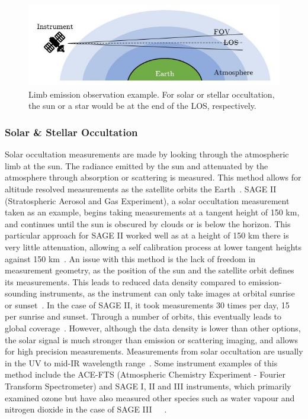  \begin{figure}
\centering
  \includegraphics{chap2_images/Limb_emission_geometry_example.JPG}
  \caption{Limb emission observation example. For solar or stellar occultation, the sun or a star would be at the end of the LOS, respectively.}
  \label{fig:limb_emission_geometry}
\end{figure}

\subsubsection{Solar \& Stellar Occultation}
Solar occultation measurements are made by looking through the atmospheric limb at the sun. The radiance emitted by the sun and attenuated by the atmosphere through absorption or scattering is measured. This method allows for altitude resolved measurements as the satellite orbits the Earth~\citep{SPARC}. SAGE II (Stratospheric Aerosol and Gas Experiment), a solar occultation measurement taken as an example, begins taking measurements at a tangent height of 150 km, and continues until the sun is obscured by clouds or is below the horizon. This particular approach for SAGE II worked well as at a height of 150 km there is very little attenuation, allowing a self calibration process at lower tangent heights against 150 km~\citep{SAGEII_solar_occultation}. An issue with this method is the lack of freedom in measurement geometry, as the position of the sun and the satellite orbit defines its measurements. This leads to reduced data density compared to emission-sounding instruments, as the instrument can only take images at orbital sunrise or sunset~\citep{SPARC}. In the case of SAGE II, it took measurements 30 times per day, 15 per sunrise and sunset. Through a number of orbits, this eventually leads to global coverage~\citep{SAGEII_solar_occultation}. However, although the data density is lower than other options, the solar signal is much stronger than emission or scattering imaging, and allows for high precision measurements. Measurements from solar occultation are usually in the UV to mid-IR wavelength range~\citep{SPARC}. Some instrument examples of this method include the ACE-FTS (Atmospheric Chemistry Experiment - Fourier Transform Spectrometer) and SAGE I, II and III instruments, which primarily examined ozone but have also measured other species such as water vapour and nitrogen dioxide in the case of SAGE III~\citep{ACE_FTS}~\citep{SAGEI_and_II}~\citep{SAGE_III}.

